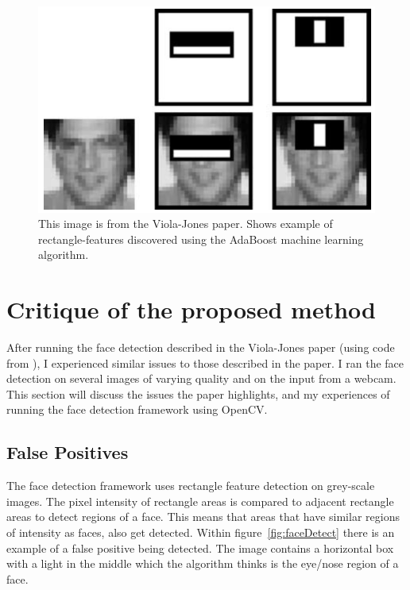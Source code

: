 \documentclass[10pt,a4paper,openbib]{article}
\begin{document}
\begin{multicols}{2}
\begin{figure}[H]
\begin{center}
\includegraphics[scale=0.52]{images/violaJones.png} 
\caption{This image is from the Viola-Jones paper\cite{violaJones}. Shows example of rectangle-features discovered using the AdaBoost machine learning algorithm.  }
\label{fig:violaJones}
\end{center}
\end{figure}

\section{Critique of the proposed method}

After running the face detection described in the Viola-Jones paper\cite{violaJones} (using code from \cite{faceCode}), I experienced similar issues to those described in the paper\cite{violaJones}. I ran the face detection on several images of varying quality and on the input from a webcam. This section will discuss the issues the paper highlights, and my experiences of running the face detection framework using OpenCV. 

\subsection{False Positives}
The face detection framework uses rectangle feature detection on grey-scale images. The pixel intensity of rectangle areas is compared to adjacent rectangle areas to detect regions of a face. This means that areas that have similar regions of intensity as faces, also get detected. Within figure~\ref{fig:faceDetect} there is an example of a false positive being detected. The image contains a horizontal box with a light in the middle which the algorithm thinks is the eye/nose region of a face.\\


\end{multicols}
\end{document}
